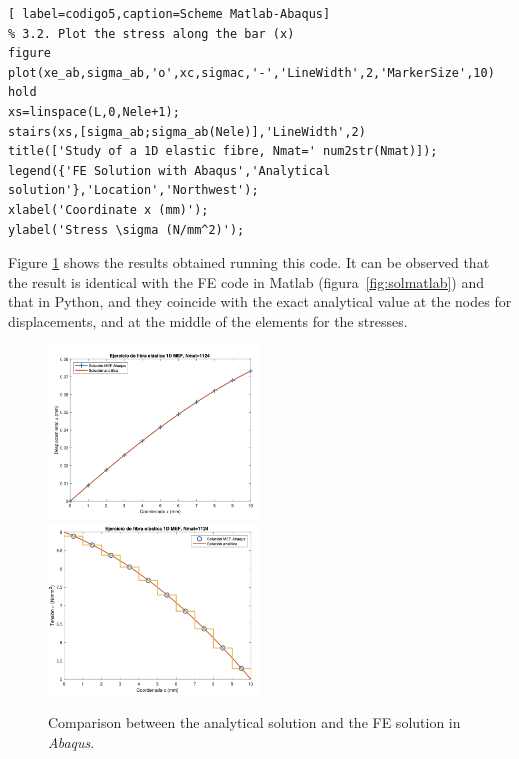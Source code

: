 \documentclass[spanish,a4paper,12pt]{article}
\begin{document}
\begin{itemize}
\begin{lstlisting}[ label=codigo5,caption=Scheme Matlab-Abaqus]
% 3.2. Plot the stress along the bar (x)
figure
plot(xe_ab,sigma_ab,'o',xc,sigmac,'-','LineWidth',2,'MarkerSize',10)
hold
xs=linspace(L,0,Nele+1);
stairs(xs,[sigma_ab;sigma_ab(Nele)],'LineWidth',2)
title(['Study of a 1D elastic fibre, Nmat=' num2str(Nmat)]);
legend({'FE Solution with Abaqus','Analytical solution'},'Location','Northwest');
xlabel('Coordinate x (mm)');
ylabel('Stress \sigma (N/mm^2)');
\end{lstlisting}

Figure \ref{fig:out3} shows the results obtained running this code. It can be observed that the result is identical with the FE code in Matlab (figura~\ref{fig:solmatlab}) and that in Python, and they coincide with the exact analytical value at the nodes for displacements, and at the middle of the elements for the stresses. 


\begin{figure}[h!tp]
\centering
\includegraphics[width=0.5\textwidth]{figuras/u-abaqus.png}%
\includegraphics[width=0.5\textwidth]{figuras/s-abaqus.png}
\caption{Comparison between the analytical solution and the FE solution in \emph{Abaqus}.}
\label{fig:out3}%
\end{figure}

\end{itemize}
\end{document}
